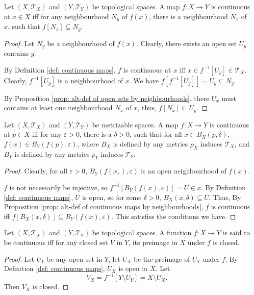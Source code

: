 \begin{proposition}
	\label{prop: alt-def of continuous maps by neighbourhoods}
	Let $(X, \mathcal T_X)$ and $(Y, \mathcal T_Y)$ be topological spaces. A map $f: X \to Y$ is continuous at $x \in X$ iff for any neighbourhood $N_y$ of $f(x)$, there is a neighbourhood $N_x$ of $x$, such that $f[N_x] \subseteq N_y$.
	
	\begin{proof}
		Let $N_y$ be a neighbourhood of $f(x)$. Clearly, there exists an open set $U_y$ contains $y$.
	
		By Definition \ref{def: continuous maps}, $f$ is continuous at $x$ iff $x \in f^{-1}[U_y] \in \mathcal T_X$. Clearly, $f^{-1}[U_y]$ is a neighbourhood of $x$. We have $f[f^{-1}[U_y]] = U_y \subseteq N_y$.
		
		By Proposition \ref{prop: alt-def of open sets by neighbourhoods}, there $U_x$ must contains at least one neighbourhood $N_x$ of $x$, thus, $f[N_x] \subseteq U_y$.
	\end{proof}
\end{proposition}


\begin{proposition}
	Let $(X, \mathcal T_X)$ and $(Y, \mathcal T_{Y})$ be metrizable spaces. A map $f: X \to Y$ is continuous at $p \in X$ iff for any $\varepsilon > 0$, there is a $\delta > 0$, such that for all $x \in B_X(p, \delta)$, $f(x) \in B_Y(f(p), \varepsilon)$, where $B_X$ is defined by any metrics $\rho_X$ induces $\mathcal T_X$, and $B_Y$ is defined by any metrics $\rho_Y$ induces $\mathcal T_Y$.
	
	\begin{proof}
		Clearly, for all $\varepsilon > 0$, $B_Y(f(x,), \varepsilon)$ is an open neighbourhood of $f(x)$.
		
		$f$ is not necessarily be injective, so $f^{-1}[B_Y(f(x), \varepsilon)] = U \in x$. By Definition \ref{def: continuous maps}, $U$ is open, so for some $\delta > 0$, $B_X(x, \delta) \subseteq U$. Thus, By Proposition \ref{prop: alt-def of continuous maps by neighbourhoods}, $f$ is continuous iff $f[B_X(x, \delta)] \subseteq B_Y(f(x), \varepsilon)$. This satisfies the conditions we have.
	\end{proof}
\end{proposition}


\begin{proposition}
	Let $(X, \mathcal T_X)$ and $(Y, \mathcal T_Y)$ be topological spaces. A function $f: X \to Y$ is said to be continuous iff for any closed set $V$ in $Y$, its preimage in $X$ under $f$ is closed.
	
	\begin{proof}
		Let $U_Y$ be any open set in $Y$, let $U_X$ be the preimage of $U_Y$ under $f$. By Definition \ref{def: continuous maps}, $U_X$ is open in $X$. Let
		$$
		V_X = f^{-1}[Y \setminus U_Y] = X \setminus U_X,
		$$
		Then $V_X$ is closed.
	\end{proof}
\end{proposition}


